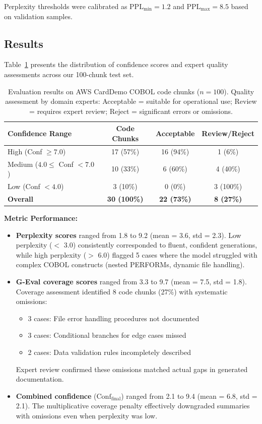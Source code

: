 Perplexity thresholds were calibrated as $\text{PPL}_{\min} = 1.2$ and $\text{PPL}_{\max} = 8.5$ based on validation samples.

\subsection{Results}

Table~\ref{tab:results} presents the distribution of confidence scores and expert quality assessments across our 100-chunk test set.

\begin{table}[t]
\centering
\begin{tabular}{lccc}
\toprule
\textbf{Confidence Range} & \textbf{Code Chunks} & \textbf{Acceptable} & \textbf{Review/Reject} \\
\midrule
High (Conf $\geq 7.0$) & 17 (57\%) & 16 (94\%) & 1 (6\%) \\
Medium ($4.0 \leq$ Conf $< 7.0$) & 10 (33\%) & 6 (60\%) & 4 (40\%) \\
Low (Conf $< 4.0$) & 3 (10\%) & 0 (0\%) & 3 (100\%) \\
\midrule
\textbf{Overall} & \textbf{30 (100\%)} & \textbf{22 (73\%)} & \textbf{8 (27\%)} \\
\bottomrule
\end{tabular}
\caption{Evaluation results on AWS CardDemo COBOL code chunks ($n=100$). Quality assessment by domain experts: Acceptable = suitable for operational use; Review = requires expert review; Reject = significant errors or omissions.}
\label{tab:results}
\end{table}

\textbf{Metric Performance:}
\begin{itemize}
    \item \textbf{Perplexity scores} ranged from 1.8 to 9.2 (mean = 3.6, std = 2.3). Low perplexity ($<$ 3.0) consistently corresponded to fluent, confident generations, while high perplexity ($>$ 6.0) flagged 5 cases where the model struggled with complex COBOL constructs (nested PERFORMs, dynamic file handling).
    
    \item \textbf{G-Eval coverage scores} ranged from 3.3 to 9.7 (mean = 7.5, std = 1.8). Coverage assessment identified 8 code chunks (27\%) with systematic omissions:
    \begin{itemize}
        \item 3 cases: File error handling procedures not documented
        \item 3 cases: Conditional branches for edge cases missed  
        \item 2 cases: Data validation rules incompletely described
    \end{itemize}
    Expert review confirmed these omissions matched actual gaps in generated documentation.
    
    \item \textbf{Combined confidence} ($\text{Conf}_{\text{final}}$) ranged from 2.1 to 9.4 (mean = 6.8, std = 2.1). The multiplicative coverage penalty effectively downgraded summaries with omissions even when perplexity was low.
\end{itemize}

